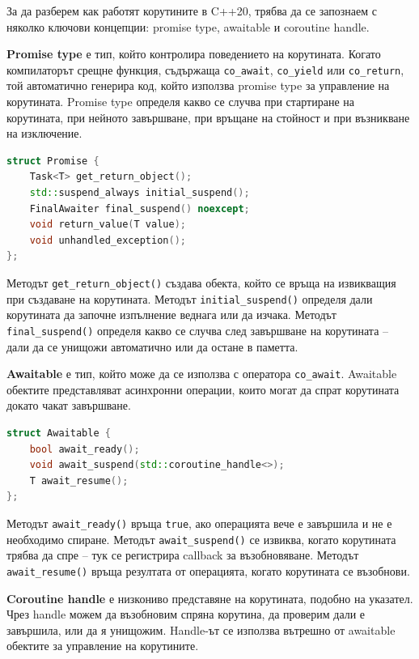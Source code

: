 За да разберем как работят корутините в C++20, трябва да се запознаем с няколко ключови концепции: promise type, awaitable и coroutine handle.

\textbf{Promise type} е тип, който контролира поведението на корутината. Когато компилаторът срещне функция, съдържаща \texttt{co\_await}, \texttt{co\_yield} или \texttt{co\_return}, той автоматично генерира код, който използва promise type за управление на корутината. Promise type определя какво се случва при стартиране на корутината, при нейното завършване, при връщане на стойност и при възникване на изключение.

\begin{lstlisting}[language=C++, basicstyle=\small\ttfamily, caption={Promise type структура}]
struct Promise {
    Task<T> get_return_object();
    std::suspend_always initial_suspend();
    FinalAwaiter final_suspend() noexcept;
    void return_value(T value);
    void unhandled_exception();
};
\end{lstlisting}

Методът \texttt{get\_return\_object()} създава обекта, който се връща на извикващия при създаване на корутината. Методът \texttt{initial\_suspend()} определя дали корутината да започне изпълнение веднага или да изчака. Методът \texttt{final\_suspend()} определя какво се случва след завършване на корутината -- дали да се унищожи автоматично или да остане в паметта.

\textbf{Awaitable} е тип, който може да се използва с оператора \texttt{co\_await}. Awaitable обектите представляват асинхронни операции, които могат да спрат корутината докато чакат завършване.

\begin{lstlisting}[language=C++, basicstyle=\small\ttfamily, caption={Awaitable интерфейс}]
struct Awaitable {
    bool await_ready();
    void await_suspend(std::coroutine_handle<>);
    T await_resume();
};
\end{lstlisting}

Методът \texttt{await\_ready()} връща \texttt{true}, ако операцията вече е завършила и не е необходимо спиране. Методът \texttt{await\_suspend()} се извиква, когато корутината трябва да спре -- тук се регистрира callback за възобновяване. Методът \texttt{await\_resume()} връща резултата от операцията, когато корутината се възобнови.

\textbf{Coroutine handle} е низкониво представяне на корутината, подобно на указател. Чрез handle можем да възобновим спряна корутина, да проверим дали е завършила, или да я унищожим. Handle-ът се използва вътрешно от awaitable обектите за управление на корутините.

